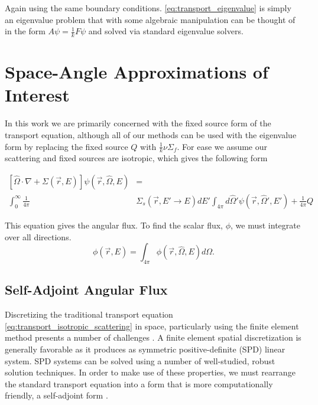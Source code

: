Again using the same boundary conditions. \eqref{eq:transport_eigenvalue} is simply an eigenvalue problem that with some algebraic manipulation can be thought of in the form $A\psi = \frac{1}{k} F\psi$ and solved via standard eigenvalue solvers. 

\section{Space-Angle Approximations of Interest}
In this work we are primarily concerned with the fixed source form of the transport equation, although all of our methods can be used with the eigenvalue form by replacing the fixed source $Q$ with $\frac{1}{k}\nu\Sigma_f$. For ease we assume our scattering and fixed sources are isotropic, which gives the following form

\begin{equation}
\begin{split}
 [\hat{\Omega} \cdot \nabla + \Sigma(\vec{r}, E)]\psi(\vec{r}, \hat{\Omega}, E) &= \\  \int_0^\infty \frac{1}{4\pi} &\Sigma_s(\vec{r}, E' \rightarrow E)  dE' \int_{4\pi} d\hat{\Omega}'\psi(\vec{r}, \hat{\Omega}', E')  + \frac{1}{4\pi}Q 
\end{split}
 \label{eq:transport_isotropic_scattering}
\end{equation}


This equation gives the angular flux. To find the scalar flux, $\phi$, we must integrate over all directions.
\begin{equation}
    \phi(\vec{r}, E) = \int_{4\pi} \phi(\vec{r}, \hat{\Omega}, E) d \Omega.
\end{equation}

\subsection{Self-Adjoint Angular Flux}
Discretizing the traditional transport equation \eqref{eq:transport_isotropic_scattering} in space, particularly using the finite element method presents a number of challenges \cite{saaf}. A finite element spatial discretization is generally favorable as it produces as symmetric positive-definite (SPD) linear system. SPD systems can be solved using a number of well-studied, robust solution techniques. In order to make use of these properties, we must rearrange the standard transport equation into a form that is more computationally friendly, a self-adjoint form \cite{saaf}.



